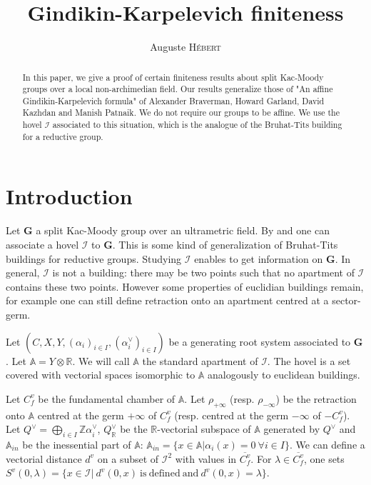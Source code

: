 \documentclass[12pt]{article}
\date{}
\title{Gindikin-Karpelevich finiteness}
\author{Auguste \textsc{Hébert}}
\theoremstyle{plain}
\theoremstyle{definition}
\newcommand{\R}{\mathbb{R}}
\newcommand{\A}{\mathbb{A}}
\newcommand{\Z}{\mathbb{Z}}
\newcommand{\I}{\mathcal{I}}
\begin{document}
\maketitle


\begin{abstract}
In this paper, we give a proof of certain finiteness results about split Kac-Moody groups over a local non-archimedian field. Our results generalize those of "An affine Gindikin-Karpelevich formula" of Alexander Braverman, Howard Garland, David Kazhdan and Manish Patnaik. We do not require our groups to be affine. We use the hovel $\I$ associated to this situation, which is the analogue of the Bruhat-Tits building for a reductive group.
\end{abstract}

\section{Introduction}

Let $\textbf{G}$ a split Kac-Moody group over an ultrametric field. By \cite{gaussent2008kac} and \cite{rousseau2012almost} one can associate a hovel $\I$ to $\textbf{G}$. This is some kind of generalization of Bruhat-Tits buildings for reductive groups. Studying $\I$ enables to get information on $\textbf{G}$. In general, $\I$ is not a building: there may be two points such that no apartment of $\I$ contains these two points. However some properties of euclidian buildings remain, for example one can still define retraction onto an apartment centred at a sector-germ.


Let $(C,X,Y,(\alpha_i)_{i\in I},(\alpha_i^\vee)_{i\in I})$ be a generating root system associated to $\textbf{G}$.  Let $\A=Y\otimes \R$. We will call $\A$ the standard apartment of $\I$. The hovel is a set covered with vectorial spaces isomorphic to $\A$ analogously to euclidean buildings. 




Let $C_f^v$ be the fundamental chamber of $\A$. Let $\rho_{+\infty}$ (resp. $\rho_{-\infty}$) be the retraction onto $\A$ centred at the germ $+\infty$ of $C_f^v$ (resp. centred at the germ $-\infty$ of $-C_f^v$). Let $Q^\vee=\bigoplus_{i\in I} \Z \alpha_i^\vee$, $Q^\vee_\R$ be the $\R$-vectorial subspace of $\A$ generated by $Q^\vee$ and $\A_{in}$ be the inessential part of $\A$: $\A_{in}=\{x\in \A |\alpha_i(x)=0\ \forall i\in I\}$. We can define a vectorial distance $d^v$ on a subset of $\I^2$ with values in $\overline{C_f^v}$. For $\lambda\in \overline{C_f^v}$, one sets $S^v(0,\lambda)=\{x\in\I|\ d^v(0,x)\mathrm{\ is\ defined\ and\ }d^v(0,x)=\lambda\}$.
\end{document}
